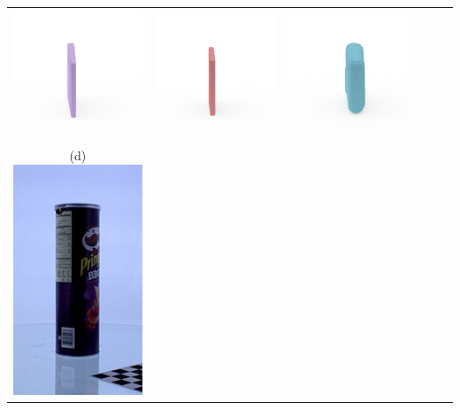 \documentclass[10pt,onecolumn,letterpaper]{article}
\begin{document}
\begin{tabular}{cccccc}
\includegraphics[height=\turnheight, clip=true, trim=60 30 30 5]{quaker_big_chewy_chocolate_chip_NP1_0_bb_view_0.png} &
\includegraphics[height=\turnheight, clip=true, trim=60 30 30 5]{quaker_big_chewy_chocolate_chip_NP1_0_zheng_view_0.png} &
\includegraphics[height=\turnheight, clip=true, trim=60 30 30 5]{quaker_big_chewy_chocolate_chip_NP1_0_oma_view_0} \\
(d) \includegraphics[height=\turnheight, clip=true, trim=20 30 30 5]{pringles_bbq_NP1_312.png} &

\end{tabular}
\end{document}
